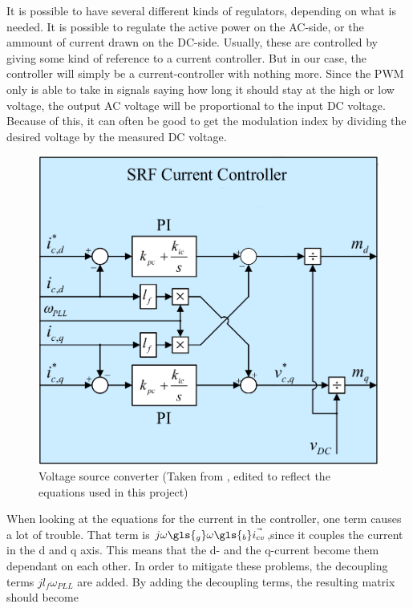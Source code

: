 It is possible to have several different kinds of regulators, depending on what is needed. It is possible to regulate the active power on the AC-side, or the ammount of current drawn on the DC-side. Usually, these are controlled by giving some kind of reference to a current controller. But in our case, the controller will simply be a current-controller with nothing more. Since the PWM only is able to take in signals saying how long it should stay at the high or low voltage, the output AC voltage will be proportional to the input DC voltage. Because of this, it can often be good to get the modulation index by dividing the desired voltage by the measured DC voltage. 
\noindent
\begin{figure}[ht]
 \centering
 \includegraphics[width=\textwidth,height=\textheight,keepaspectratio]{Figures/stolen_controller_edit.png}
 \caption{Voltage source converter (Taken from \cite{Suul_electro_presentation_1,Suul_paper_1}, edited to reflect the equations used in this project)}
 \label{fig:decoupled_controller}
\end{figure}{}
When looking at the equations for the current in the controller, one term causes a lot of trouble. That term is $j\omega\gls{_g}\omega\gls{_b}\Vec{i_{cv}}$,since it couples the current in the d and q axis. This means that the d- and the q-current become them dependant on each other. In order to mitigate these problems, the decoupling terms $j l_f\omega_{PLL}$ are added. By adding the decoupling terms, the resulting matrix should become 
